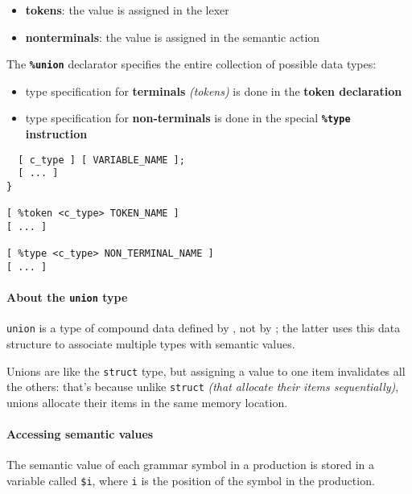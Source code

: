 \begin{itemize}
  \item \textbf{tokens}: the value is assigned in the lexer
  \item \textbf{nonterminals}: the value is assigned in the semantic action
\end{itemize}

The \textbf{\texttt{\%union}} declarator specifies the entire collection of possible data types:

\begin{itemize}
  \item type specification for \textbf{terminals} \textit{(tokens)} is done in the \textbf{token declaration}
  \item type specification for \textbf{non-terminals} is done in the special \textbf{\texttt{\%type} instruction}
\end{itemize}

\begin{onepage}
  \begin{lstlisting}[language=LANCE, caption={Semantic value declaration}, label={lst:bison-semantic-value-declaration}]
%union {
  [ c_type ] [ VARIABLE_NAME ];
  [ ... ]
}

[ %token <c_type> TOKEN_NAME ]
[ ... ]

[ %type <c_type> NON_TERMINAL_NAME ]
[ ... ]
\end{lstlisting}
\end{onepage}

\paragraph*{About the \texttt{union} type}
\texttt{union} is a type of compound data defined by \clang, not by \bison;
the latter uses this data structure to associate multiple types with semantic values.

Unions are like the \texttt{struct} type, but assigning a value to one item invalidates all the others:
that's because unlike \texttt{struct} \textit{(that allocate their items sequentially)}, unions allocate their items in the same memory location.

\paragraph*{Accessing semantic values}
The semantic value of each grammar symbol in a production is stored in a variable called \texttt{\$i}, where \texttt{i} is the position of the symbol in the production.

